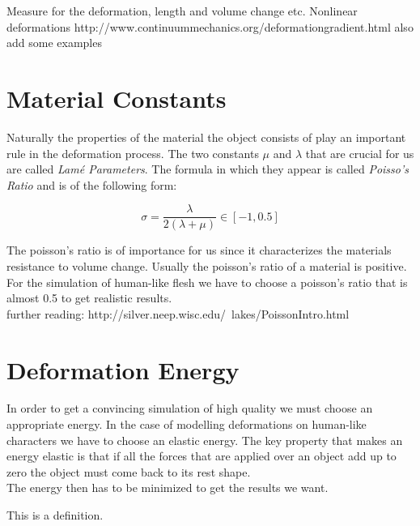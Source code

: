 Measure for the deformation, length and volume change etc.
Nonlinear deformations
http://www.continuummechanics.org/deformationgradient.html
also add some examples

\section{Material Constants}

Naturally the properties of the material the object consists of play an important rule in the deformation process. The two constants $\mu$ and $\lambda$ that are crucial for us are called \textit{Lamé Parameters}. The formula in which they appear is called \textit{Poisso's Ratio} and is of the following form:

\[ \sigma =  \frac{\lambda}{2(\lambda + \mu)} \in [-1, 0.5] \]

The poisson's ratio is of importance for us since it characterizes the materials resistance to volume change. Usually the poisson's ratio of a material is positive.
\\
For the simulation of human-like flesh we have to choose a poisson's ratio that is almost 0.5 to get realistic results.
\\ further reading: http://silver.neep.wisc.edu/~lakes/PoissonIntro.html


\section{Deformation Energy}

In order to get a convincing simulation of high quality we must choose an appropriate energy. In the case of modelling deformations on human-like characters we have to choose an elastic energy. The key property that makes an energy elastic is that if all the forces that are applied over an object add up to zero the object must come back to its rest shape.
\\
The energy then has to be minimized to get the results we want.

\begin{definition}
  This is a definition.
\end{definition}



